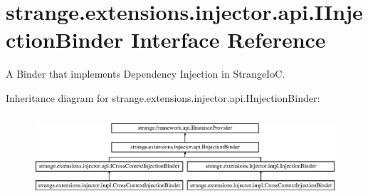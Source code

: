 \hypertarget{interfacestrange_1_1extensions_1_1injector_1_1api_1_1_i_injection_binder}{\section{strange.\-extensions.\-injector.\-api.\-I\-Injection\-Binder Interface Reference}
\label{interfacestrange_1_1extensions_1_1injector_1_1api_1_1_i_injection_binder}
}


A Binder that implements Dependency Injection in Strange\-Io\-C.  


Inheritance diagram for strange.\-extensions.\-injector.\-api.\-I\-Injection\-Binder\-:\begin{figure}[H]
\begin{center}
\leavevmode
\includegraphics[height=3.111111cm]{interfacestrange_1_1extensions_1_1injector_1_1api_1_1_i_injection_binder}
\end{center}
\end{figure}
